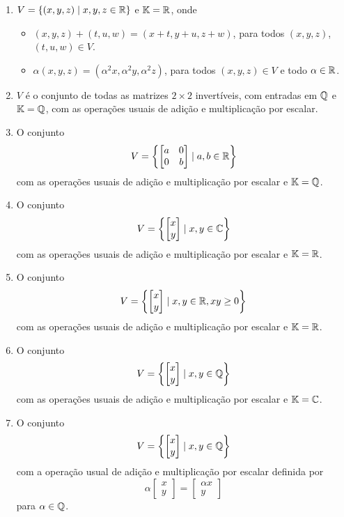 \documentclass[12pt]{exam}
\begin{document}
\begin{exercicio}
\begin{enumerate}[label={\alph*)}]
    \item $V = \{(x, y, z) \mid x, y, z \in \mathbb{R}\}$ e $\mathbb{K} = \mathbb{R}$, onde
      \begin{itemize}
        \item $(x, y, z) + (t, u, w) = (x + t, y + u, z + w)$, para todos $(x, y, z)$, $(t, u, w) \in V$.
        \item $\alpha(x, y, z) = (\alpha^2 x, \alpha^2 y, \alpha^2 z)$, para todos $(x, y, z) \in V$ e todo $\alpha \in \mathbb{R}$.
      \end{itemize}

    \item $V$ é o conjunto de todas as matrizes $2 \times 2$ invertíveis, com entradas em $\mathbb{Q}$ e $\mathbb{K} = \mathbb{Q}$, com as operações usuais de adição e multiplicação por escalar.

    \item O conjunto
      \[
        V = \left\{\begin{bmatrix}a & 0\\0 & b \end{bmatrix} \mid a, b \in \mathbb{R}\right\}
      \]
      com as operações usuais de adição e multiplicação por escalar e $\mathbb{K} = \mathbb{Q}$.

    \item O conjunto
      \[
         V = \left\{\begin{bmatrix}x\\y \end{bmatrix} \mid x, y \in \mathbb{C}\right\}
      \]
      com as operações usuais de adição e multiplicação por escalar e $\mathbb{K} = \mathbb{R}$.

    \item O conjunto
      \[
         V = \left\{\begin{bmatrix}x\\y \end{bmatrix} \mid x, y \in \mathbb{R}, xy \ge 0\right\}
      \]
      com as operações usuais de adição e multiplicação por escalar e $\mathbb{K} = \mathbb{R}$.

    \item O conjunto
      \[
         V = \left\{\begin{bmatrix}x\\y \end{bmatrix} \mid x, y \in \mathbb{Q}\right\}
      \]
      com as operações usuais de adição e multiplicação por escalar e  $\mathbb{K} = \mathbb{C}$.

    \item O conjunto
      \[
         V = \left\{\begin{bmatrix}x\\y \end{bmatrix} \mid x, y \in \mathbb{Q}\right\}
      \]
      com a operação usual de adição e multiplicação por escalar definida por
      \[
        \alpha\begin{bmatrix}x\\y\end{bmatrix} = \begin{bmatrix}\alpha x\\y\end{bmatrix}
      \]
      para $\alpha \in \mathbb{Q}$.
      

\end{enumerate}
\end{exercicio}
\end{document}
